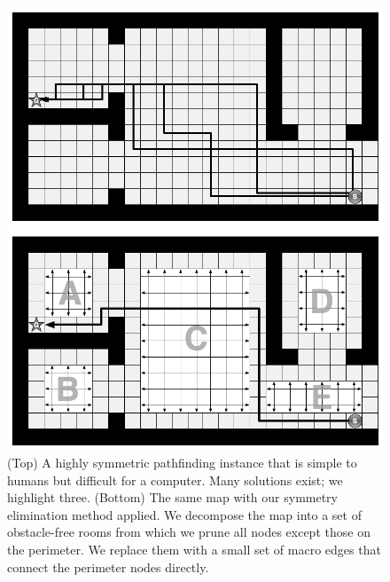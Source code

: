\begin{figure}[tb]
       \begin{center}
                       \includegraphics[scale=0.30, trim = 10mm 10mm 10mm 0mm]{diagrams/overview.png}
       \end{center}
	\vspace{-3pt}
       \caption{(Top) A highly symmetric pathfinding instance that is simple to humans but difficult 
				for a computer.
				Many solutions exist; we highlight three. 
				(Bottom) The same map with our symmetry elimination method applied. We decompose the map
				into a set of obstacle-free rooms from which we prune all nodes except those on the perimeter.
				We replace them with a small set of macro edges that connect the perimeter nodes directly.} 
       \label{fig-overview}
\end{figure}

